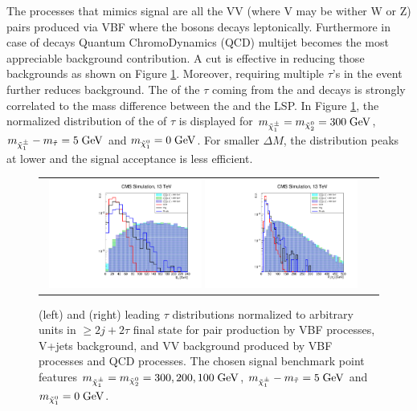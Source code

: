 The processes that mimics signal are all the VV (where V may be wither W or Z) pairs produced via VBF where the bosons decays leptonically. Furthermore in case of \hadtau decays Quantum ChromoDynamics (QCD) multijet becomes the most appreciable background contribution. A \met cut is eﬀective in reducing those backgrounds as shown on Figure \ref{fig:VBF_met_pttau}. Moreover, requiring multiple $\tau$’s in the event further reduces background. The \pt of the \ensuremath{\tau} coming from the \charginopm and \neutralinotwo decays is strongly correlated to the mass difference between the \charginopm and the \neutralinoone LSP. In Figure \ref{fig:VBF_met_pttau}, the normalized distribution of the \pt of \ensuremath{\tau} is displayed for \ensuremath{m_{\charginopm} = m_{\neutralinotwo} = 300\gev}, \ensuremath{m_{\charginopm} - m_{\tilde{\tau}} = 5\gev} and \ensuremath{m_{\neutralinoone} = 0\gev}. For smaller \ensuremath{\Delta M}, the distribution peaks at lower \pt and the signal acceptance is less efficient.

\begin{figure}[tbh!]
	\centering
	\begin{tabular}{cc}
		\includegraphics[width=0.48\textwidth]{analysis/pics/h_met_prospects13tev.pdf}
		\includegraphics[width=0.48\textwidth]{analysis/pics/h_tau1pt_prospects13tev.pdf} 		
	\end{tabular}
	\caption{(left) \met and (right) leading \ensuremath{\tau} \pt distributions normalized to arbitrary units in \ensuremath{\geq 2j + 2\tau} final state for \charginopm \charginopm pair production by VBF processes, V+jets background, and VV background produced by VBF processes and QCD processes. The chosen signal benchmark point features \ensuremath{m_{\charginopm} = m_{\neutralinotwo} = 300, 200, 100\gev}, \ensuremath{m_{\charginopm} - m_{\tilde{\tau}} = 5\gev} and \ensuremath{m_{\neutralinoone} = 0\gev}.}
	\label{fig:VBF_met_pttau}
\end{figure}

